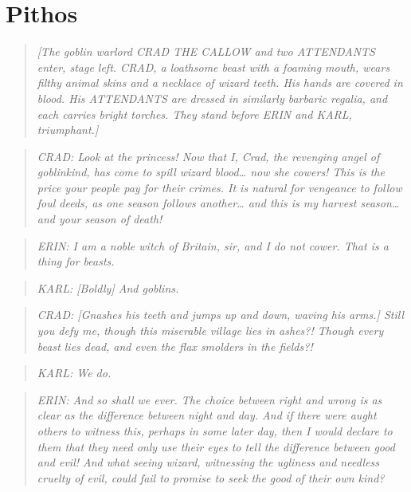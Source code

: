 \hypertarget{pithos}{%
\chapter{Pithos}\label{pithos}}

\begin{quote}
\emph{{[}The goblin warlord CRAD THE CALLOW and two ATTENDANTS enter,
stage left. CRAD, a loathsome beast with a foaming mouth, wears filthy
animal skins and a necklace of wizard teeth. His hands are covered in
blood. His ATTENDANTS are dressed in similarly barbaric regalia, and
each carries bright torches. They stand before ERIN and KARL,
triumphant.{]}}
\end{quote}

\begin{quote}
\emph{CRAD: Look at the princess! Now that I, Crad, the revenging angel
of goblinkind, has come to spill wizard blood\ldots{} now she cowers!
This is the price your people pay for their crimes. It is natural for
vengeance to follow foul deeds, as one season follows another\ldots{}
and this is my harvest season\ldots{} and your season of death!}
\end{quote}

\begin{quote}
\emph{ERIN: I am a noble witch of Britain, sir, and I do not cower. That
is a thing for beasts.}
\end{quote}

\begin{quote}
\emph{KARL: {[}Boldly{]} And goblins.}
\end{quote}

\begin{quote}
\emph{CRAD: {[}Gnashes his teeth and jumps up and down, waving his
arms.{]} Still you defy me, though this miserable village lies in
ashes?! Though every beast lies dead, and even the flax smolders in the
fields?!}
\end{quote}

\begin{quote}
\emph{KARL: We do.}
\end{quote}

\begin{quote}
\emph{ERIN: And so shall we ever. The choice between right and wrong is
as clear as the difference between night and day. And if there were
aught others to witness this, perhaps in some later day, then I would
declare to them that they need only use their eyes to tell the
difference between good and evil! And what seeing wizard, witnessing the
ugliness and needless cruelty of evil, could fail to promise to seek the
good of their own kind?}
\end{quote}

